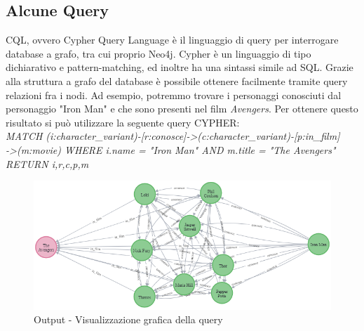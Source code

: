 \documentclass[
12pt, %
a4paper, %
oneside, %
headinclude,footinclude, %
BCOR5mm, %
]{scrartcl}
\begin{document}
\subsection{Alcune Query}
CQL, ovvero Cypher Query Language è il linguaggio di query per interrogare database a grafo, tra cui proprio Neo4j. Cypher è un linguaggio di tipo dichiarativo e pattern-matching, ed inoltre ha una sintassi simile ad SQL.
Grazie alla struttura a grafo del database è possibile ottenere facilmente tramite query relazioni fra i nodi. Ad esempio, potremmo trovare i personaggi conosciuti dal personaggio "Iron Man" e che sono presenti nel film \textit{Avengers}. 
	Per ottenere questo risultato si può utilizzare la seguente query 
	CYPHER: \\\newline \textit{MATCH (i:character\_variant)-[r:conosce]->(c:character\_variant)-[p:in\_film]\\->(m:movie) WHERE i.name = "Iron Man"  AND m.title = "The Avengers" RETURN i,r,c,p,m}
\begin{figure}[H]
  \includegraphics[scale=0.5]{./Figures/query_1.png}
  \caption{Output - Visualizzazione grafica della query}
\end{figure}
\end{document}

